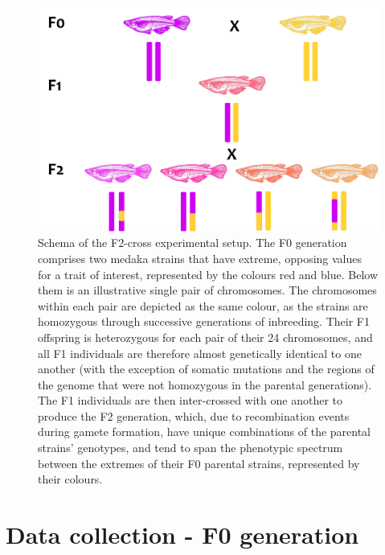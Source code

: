 \documentclass[
]{book}
\begin{document}
\begin{figure}
\includegraphics[width=1\linewidth]{figs/mikk_behaviour/F2-cross-schema} \caption{Schema of the F2-cross experimental setup. The F0 generation comprises two medaka strains that have extreme, opposing values for a trait of interest, represented by the colours red and blue. Below them is an illustrative single pair of chromosomes. The chromosomes within each pair are depicted as the same colour, as the strains are homozygous through successive generations of inbreeding. Their F1 offspring is heterozygous for each pair of their 24 chromosomes, and all F1 individuals are therefore almost genetically identical to one another (with the exception of somatic mutations and the regions of the genome that were not homozygous in the parental generations). The F1 individuals are then inter-crossed with one another to produce the F2 generation, which, due to recombination events during gamete formation, have unique combinations of the parental strains' genotypes, and tend to span the phenotypic spectrum between the extremes of their F0 parental strains, represented by their colours.}\label{fig:F2-cross-schema}
\end{figure}

\hypertarget{data-collection---f0-generation}{%
\section{Data collection - F0 generation}\label{data-collection---f0-generation}}
\end{document}
